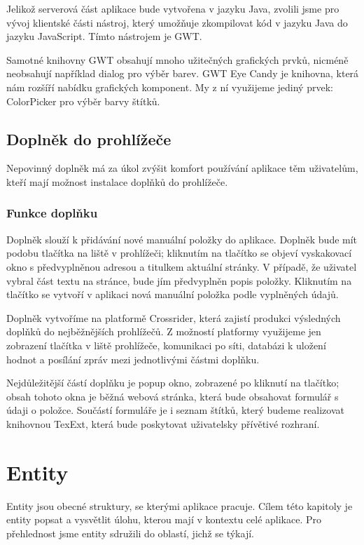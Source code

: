 Jelikož serverová část aplikace bude vytvořena v jazyku Java, zvolili jsme pro vývoj klientské části nástroj, který umožňuje zkompilovat kód v jazyku Java do jazyku JavaScript.
Tímto nástrojem je GWT.

Samotné knihovny GWT obsahují mnoho užitečných grafických prvků, nic\-mé\-ně neobsahují například dialog pro výběr barev.
GWT Eye Candy je knihovna, která nám rozšíří nabídku grafických komponent.
My z ní využijeme jediný prvek: ColorPicker pro výběr barvy štítků.

\subsection{Doplněk do prohlížeče}

Nepovinný doplněk má za úkol zvýšit komfort používání aplikace těm uživatelům, kteří mají možnost instalace doplňků do prohlížeče.

\subsubsection{Funkce doplňku}

Doplněk slouží k přidávání nové manuální položky do aplikace.
Doplněk bude mít podobu tlačítka na liště v prohlížeči; kliknutím na tlačítko se objeví vyskakovací okno s předvyplněnou adresou a titulkem aktuální stránky.
V případě, že uživatel vybral část textu na stránce, bude jím předvyplněn popis položky.
Kliknutím na tlačítko  se vytvoří v aplikaci nová manuální položka podle vyplněných údajů.

\bigskip

Doplněk vytvoříme na platformě Crossrider, která zajistí produkci výsledných doplňků do nejběžnějších prohlížečů.
Z možností platformy využijeme jen zobrazení tlačítka v liště prohlížeče, komunikaci po síti, databázi k uložení hodnot a posílání zpráv mezi jednotlivými částmi doplňku.

Nejdůležitější částí doplňku je popup okno, zobrazené po kliknutí na tlačítko; obsah tohoto okna je běžná webová stránka, která bude obsahovat formulář s údaji o položce.
Součástí formuláře je i seznam štítků, který budeme realizovat knihovnou TexExt, která bude poskytovat uživatelsky přívětivé rozhraní.

\section{Entity}

Entity jsou obecné struktury, se kterými aplikace pracuje.
Cílem této kapitoly je entity popsat a vysvětlit úlohu, kterou mají v kontextu celé aplikace.
Pro přehlednost jsme entity sdružili do oblastí, jichž se týkají.

